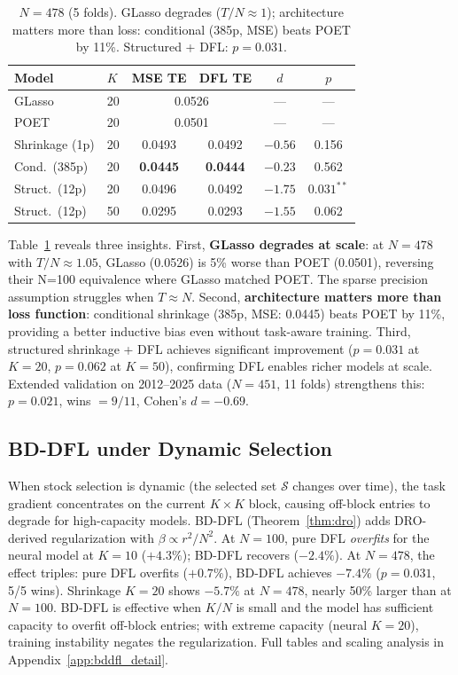 \documentclass[letterpaper]{article}
\newcommand{\cS}{\mathcal{S}}
\begin{document}
\begin{table}[t]
\centering
\caption{$N{=}478$ (5 folds). GLasso degrades ($T/N \approx 1$); architecture matters more than loss: conditional (385p, MSE) beats POET by 11\%. Structured + DFL: $p = 0.031$.}
\label{tab:n500}
\small
\begin{tabular}{@{}llcccc@{}}
\toprule
Model & $K$ & MSE TE & DFL TE & $d$ & $p$ \\
\midrule
GLasso & 20 & \multicolumn{2}{c}{0.0526} & --- & --- \\
POET & 20 & \multicolumn{2}{c}{0.0501} & --- & --- \\
Shrinkage (1p) & 20 & 0.0493 & 0.0492 & $-0.56$ & 0.156 \\
Cond.\ (385p) & 20 & \textbf{0.0445} & \textbf{0.0444} & $-0.23$ & 0.562 \\
Struct.\ (12p) & 20 & 0.0496 & 0.0492 & $-1.75$ & $0.031^{**}$ \\
Struct.\ (12p) & 50 & 0.0295 & 0.0293 & $-1.55$ & 0.062 \\
\bottomrule
\end{tabular}
\end{table}

Table~\ref{tab:n500} reveals three insights. First, \textbf{GLasso degrades at scale}: at $N{=}478$ with $T/N \approx 1.05$, GLasso (0.0526) is 5\% worse than POET (0.0501), reversing their N{=}100 equivalence where GLasso matched POET. The sparse precision assumption struggles when $T \approx N$. Second, \textbf{architecture matters more than loss function}: conditional shrinkage (385p, MSE: 0.0445) beats POET by 11\%, providing a better inductive bias even without task-aware training. Third, structured shrinkage + DFL achieves significant improvement ($p = 0.031$ at $K{=}20$, $p = 0.062$ at $K{=}50$), confirming DFL enables richer models at scale. Extended validation on 2012--2025 data ($N{=}451$, 11 folds) strengthens this: $p = 0.021$, wins $= 9/11$, Cohen's $d = -0.69$.

\subsection{BD-DFL under Dynamic Selection}
\label{sec:bddfl}

When stock selection is dynamic (the selected set $\cS$ changes over time), the task gradient concentrates on the current $K \times K$ block, causing off-block entries to degrade for high-capacity models. BD-DFL (Theorem~\ref{thm:dro}) adds DRO-derived regularization with $\beta \propto r^2/N^2$. At $N{=}100$, pure DFL \emph{overfits} for the neural model at $K{=}10$ ($+4.3\%$); BD-DFL recovers ($-2.4\%$). At $N{=}478$, the effect triples: pure DFL overfits ($+0.7\%$), BD-DFL achieves $\mathbf{-7.4\%}$ ($p = 0.031$, 5/5 wins). Shrinkage $K{=}20$ shows $-5.7\%$ at $N{=}478$, nearly 50\% larger than at $N{=}100$. BD-DFL is effective when $K/N$ is small and the model has sufficient capacity to overfit off-block entries; with extreme capacity (neural $K{=}20$), training instability negates the regularization. Full tables and scaling analysis in Appendix~\ref{app:bddfl_detail}.
\end{document}
